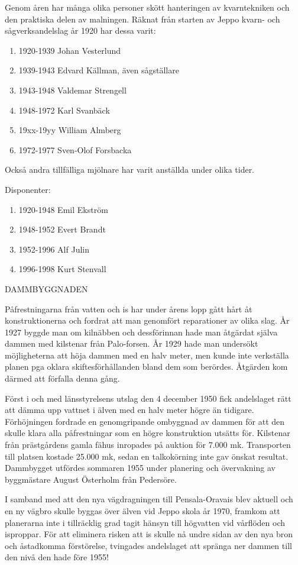 Genom åren har många olika personer skött hanteringen av kvarntekniken och den praktiska delen av malningen. Räknat från starten av Jeppo kvarn- och sågverksandelslag år 1920 har dessa varit:
\begin{enumerate}
  \item 1920-1939		Johan Vesterlund
  \item 1939-1943		Edvard Källman, även sågställare
  \item 1943-1948		Valdemar Strengell
  \item 1948-1972		Karl Svanbäck
  \item 19xx-19yy   William Almberg
  \item 1972-1977		Sven-Olof Forsbacka
\end{enumerate}
Också andra tillfälliga mjölnare har varit anställda under olika tider.

Disponenter:
\begin{enumerate}
  \item 1920-1948		Emil Ekström
  \item 1948-1952		Evert Brandt
  \item 1952-1996		Alf Julin
  \item 1996-1998	  Kurt Stenvall
\end{enumerate}


DAMMBYGGNADEN

Påfrestningarna från vatten och is har under årens lopp gått hårt åt konstruktionerna och fordrat att man genomfört reparationer av olika slag. År 1927 byggde man om kilnäbben och dessförinnan hade man åtgärdat själva dammen med kilstenar från Palo-forsen. År 1929 hade man undersökt möjligheterna att höja dammen med en halv meter, men kunde inte verkställa planen pga oklara skiftesförhållanden bland dem som berördes. Åtgärden kom därmed att förfalla denna gång.

Först i och med länsstyrelsens utslag den 4 december 1950 fick andelslaget rätt att dämma upp vattnet i älven med en halv meter högre än tidigare. Förhöjningen fordrade en genomgripande ombyggnad av dammen för att den skulle klara alla påfrestningar som en högre konstruktion utsätts för. Kilstenar från prästgårdens gamla fähus inropades på auktion för 7.000 mk. Transporten till platsen kostade 25.000 mk, sedan en talkokörning inte gav önskat resultat. Dammbygget utfördes sommaren 1955 under planering och övervakning av byggmästare August Österholm från Pedersöre.

I samband med att den nya vägdragningen till Pensala-Oravais blev aktuell och en ny vägbro skulle byggas över älven vid Jeppo skola år 1970,  framkom att planerarna inte i tillräcklig grad tagit hänsyn till högvatten vid vårflöden och isproppar. För att eliminera risken att is skulle nå undre sidan av den nya bron och åstadkomma förstörelse, tvingades andelslaget att spränga ner dammen till den nivå den hade före 1955!


